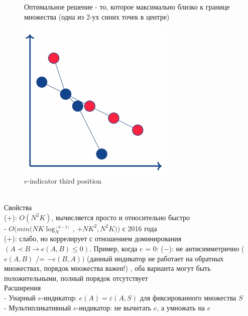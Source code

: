 \begin{figure}[!ht]
Оптимальное решение - то, которое максимально близко к границе множества (одна из 2-ух синих точек в центре)
\begin{center}
    \includegraphics[width=0.3\linewidth]{images/e-indicator2.PNG}
    \caption{$e$-indicator third position}
    \label{fig:mpr}
    
\end{center}

\end{figure}

\newpage
\\

Свойства\\
(+): $O(N^2K)$, вычисляется просто и относительно быстро\\
- $O(min(NK\log_{N}^_{(K − 2)}$, $+ NK^2, N^2K))$ с 2016 года\\
(+): слабо, но коррелирует с отношением доминирования
$(A ≺ B → e(A,B) ≤ 0)$. Пример, когда $e$ = 0:
(−): не антисимметрично ($e(A,B)$ /= $−e(B,A))$ (данный индикатор не работает на обратных множествах, порядок множества важен!) ,
оба варианта могут быть положительными,
полный порядок отсутствует\\

Расширения\\
- Унарный $e$-индикатор: $e(A) = ε(A,S)$ для фиксированного множества $S$\\
- Мультипликативный $e$-индикатор: не вычитать $e$, а умножать на $e$
